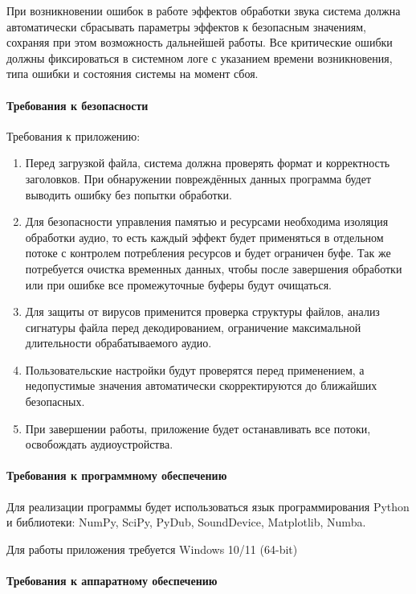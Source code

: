 При возникновении ошибок в работе эффектов обработки звука система должна автоматически сбрасывать параметры эффектов к безопасным значениям, сохраняя при этом возможность дальнейшей работы. Все критические ошибки должны фиксироваться в системном логе с указанием времени возникновения, типа ошибки и состояния системы на момент сбоя.

\paragraph{Требования к безопасности}

Требования к приложению:
\begin{enumerate}
	\item Перед загрузкой файла, система должна проверять формат и корректность заголовков. При обнаружении повреждённых данных программа будет выводить ошибку без попытки обработки.
	\item Для безопасности управления памятью и ресурсами необходима изоляция обработки аудио, то есть каждый эффект будет применяться в отдельном потоке с контролем потребления ресурсов и будет ограничен буфе. Так же потребуется очистка временных данных, чтобы после завершения обработки или при ошибке все промежуточные буферы будут очищаться.
	\item Для защиты от вирусов применится проверка структуры файлов, анализ сигнатуры файла перед декодированием, ограничение максимальной длительности обрабатываемого аудио.
	\item Пользовательские настройки будут проверятся перед применением, а недопустимые значения автоматически скорректируются до ближайших безопасных.
	\item При завершении работы, приложение будет останавливать все потоки, освобождать аудиоустройства.
\end{enumerate}

\paragraph{Требования к программному обеспечению}

Для реализации программы будет использоваться язык программирования Python и библиотеки: NumPy, SciPy, PyDub, SoundDevice, Matplotlib, Numba.

Для работы приложения требуется Windows 10/11 (64-bit)

\paragraph{Требования к аппаратному обеспечению}


